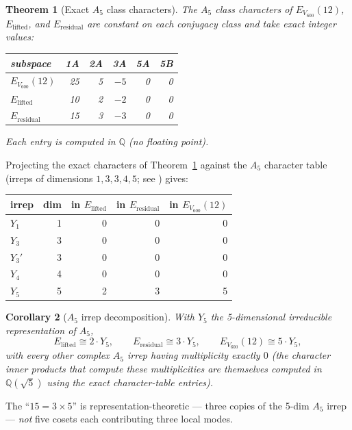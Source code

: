 \documentclass[11pt]{article}
\newcommand{\Vsix}{V_{600}}
\newcommand{\Esix}{E_{\Vsix}}
\newcommand{\Elift}{E_{\mathrm{lifted}}}
\newcommand{\Eres}{E_{\mathrm{residual}}}
\theoremstyle{plain}
\newtheorem{theorem}{Theorem}
\newtheorem{corollary}[theorem]{Corollary}
\theoremstyle{definition}
\begin{document}
\begin{theorem}[Exact $A_5$ class characters]\label{thm:chars}
The $A_5$ class characters of $\Esix(12)$, $\Elift$, and $\Eres$
are constant on each conjugacy class and take exact integer values:

\smallskip
\begin{tabular}{lrrrrr}
\toprule
subspace & 1A & 2A & 3A & 5A & 5B \\
\midrule
$\Esix(12)$ & 25 & 5  & $-5$ & 0 & 0 \\
$\Elift$    & 10 & 2  & $-2$ & 0 & 0 \\
$\Eres$     & 15 & 3  & $-3$ & 0 & 0 \\
\bottomrule
\end{tabular}
\smallskip

Each entry is computed in $\mathbb{Q}$ (no floating point).
\end{theorem}

Projecting the exact characters of Theorem~\ref{thm:chars} against
the $A_5$ character table (irreps of dimensions $1, 3, 3, 4, 5$;
see \cite{ConwayAtlas1985}) gives:

\begin{center}
\begin{tabular}{lrrrr}
\toprule
irrep & dim & in $\Elift$ & in $\Eres$ & in $\Esix(12)$\\
\midrule
$Y_1$  & 1 & 0 & 0 & 0 \\
$Y_3$  & 3 & 0 & 0 & 0 \\
$Y_3'$ & 3 & 0 & 0 & 0 \\
$Y_4$  & 4 & 0 & 0 & 0 \\
$Y_5$  & 5 & 2 & 3 & 5 \\
\bottomrule
\end{tabular}
\end{center}

\begin{corollary}[$A_5$ irrep decomposition]\label{cor:A5}
With $Y_5$ the 5-dimensional irreducible representation of $A_5$,
\[
  \Elift \cong 2\!\cdot\! Y_5,\qquad
  \Eres  \cong 3\!\cdot\! Y_5,\qquad
  \Esix(12) \cong 5\!\cdot\! Y_5,
\]
with every other complex $A_5$ irrep having multiplicity exactly $0$
(the character inner products that compute these multiplicities are
themselves computed in $\mathbb{Q}(\sqrt 5)$ using the exact
character-table entries).
\end{corollary}

The ``$15 = 3\times 5$'' is representation-theoretic — three copies
of the 5-dim $A_5$ irrep — \emph{not} five cosets each contributing
three local modes.
\end{document}
